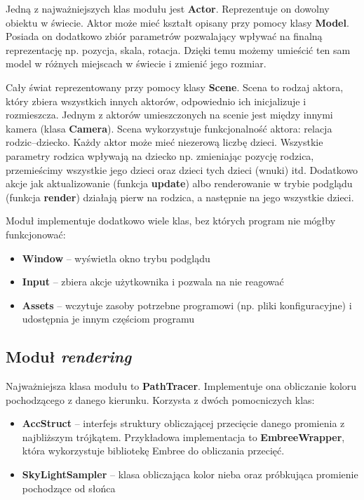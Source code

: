 \documentclass[inz,shortabstract]{iithesis}
\begin{document}
            Jedną z najważniejszych klas modułu jest \textbf{Actor}. Reprezentuje on dowolny obiektu w świecie. Aktor może mieć kształt opisany przy pomocy klasy \textbf{Model}. Posiada on dodatkowo zbiór parametrów pozwalający wpływać na finalną reprezentację np. pozycja, skala, rotacja. Dzięki temu możemy umieścić ten sam model w różnych miejscach w świecie i zmienić jego rozmiar.
            
            Cały świat reprezentowany przy pomocy klasy \textbf{Scene}. Scena to rodzaj aktora, który zbiera wszystkich innych aktorów, odpowiednio ich inicjalizuje i rozmieszcza. Jednym z aktorów umieszczonych na scenie jest między innymi kamera (klasa \textbf{Camera}). Scena wykorzystuje funkcjonalność aktora: relacja rodzic--dziecko. Każdy aktor może mieć niezerową liczbę dzieci. Wszystkie parametry rodzica wpływają na dziecko np. zmieniając pozycję rodzica, przemieścimy wszystkie jego dzieci oraz dzieci tych dzieci (wnuki) itd. Dodatkowo akcje jak aktualizowanie (funkcja \textbf{update}) albo renderowanie w trybie podglądu (funkcja \textbf{render}) działają pierw na rodzica, a następnie na jego wszystkie dzieci.
            
            Moduł implementuje dodatkowo wiele klas, bez których program nie mógłby funkcjonować:
            \begin{itemize}
                \item \textbf{Window} -- wyświetla okno trybu podglądu
                \item \textbf{Input} -- zbiera akcje użytkownika i pozwala na nie reagować
                \item \textbf{Assets} -- wczytuje zasoby potrzebne programowi (np. pliki konfiguracyjne) i udostępnia je innym częściom programu 
            \end{itemize}
            
        \subsection{Moduł \textit{rendering}}
            Najważniejsza klasa modułu to \textbf{PathTracer}. Implementuje ona obliczanie koloru pochodzącego z danego kierunku. Korzysta z dwóch pomocniczych klas:
            \begin{itemize}
                \item \textbf{AccStruct} -- interfejs struktury obliczającej przecięcie danego promienia z najbliższym trójkątem. Przykładowa implementacja to \textbf{EmbreeWrapper}, która wykorzystuje bibliotekę Embree do obliczania przecięć. 
                \item \textbf{SkyLightSampler} -- klasa obliczająca kolor nieba oraz próbkująca promienie pochodzące od słońca
            \end{itemize}
            
\end{document}
